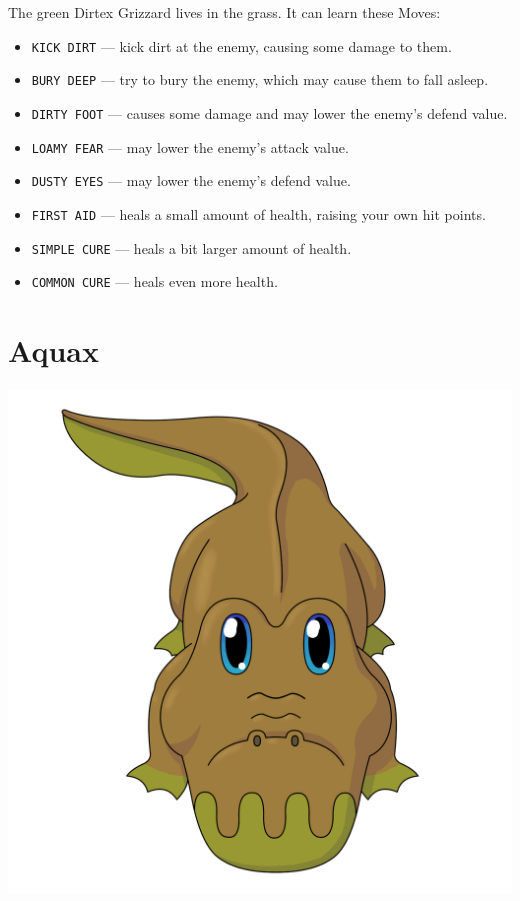 \documentclass[10pt,twocolumn,openany,article]{memoir}
\begin{document}
\begin{description}
The green Dirtex Grizzard lives in the grass. It can learn these Moves:

\begin{itemize}
\item \texttt{KICK DIRT} --- kick dirt at the enemy, causing some damage
  to them.
\item \texttt{BURY DEEP} --- try to bury the enemy, which may cause them
  to fall asleep.
\item  \texttt{DIRTY FOOT}  --- causes  some  damage and  may lower  the
  enemy's defend value.
\item \texttt{LOAMY FEAR} --- may lower the enemy's attack value.
\item \texttt{DUSTY EYES} --- may lower the enemy's defend value.
\item \texttt{FIRST  AID} ---  heals a small  amount of  health, raising
  your own hit points.
\item \texttt{SIMPLE CURE} --- heals a bit larger amount of health.
\item \texttt{COMMON CURE} --- heals even more health.
\end{itemize}

\fi

\section{Aquax}

\includegraphics[width=\columnwidth]{../Manual/Aquax.png}


\end{description}
\end{document}
